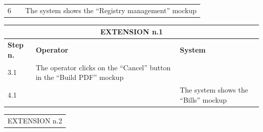 {{{\begin{table}[h]
\begin{tabular}{|p{2cm}|p{6cm}|p{6cm}|}
				\vspace{1mm} \vspace{1mm} \\
			\hline
				\vspace{1mm} 6\vspace{1mm} &
				\vspace{1mm} \vspace{1mm} & 
				\vspace{1mm} The system shows the “Registry management” mockup\vspace{1mm} \\
			\hline
			\end{tabular}
			\end{table}
			
			\begin{table}[h]
			\begin{tabular}{|p{2cm}|p{6cm}|p{6cm}|}
			\hline
				\multicolumn{3}{|c|}{EXTENSION n.1}\\
			\hline
				\centering \vspace{1mm} \bfseries{Step n.} \vspace{1mm} & \vspace{1mm} \bfseries{Operator} \vspace{1mm} & \vspace{1mm} \bfseries{System} \vspace{1mm}\\
			\hline
				\vspace{1mm} 3.1\vspace{1mm} &
				\vspace{1mm} The operator clicks on the “Cancel” button in the “Build PDF” mockup \vspace{1mm} & 
				\vspace{1mm} \vspace{1mm} \\
			\hline
				\vspace{1mm} 4.1\vspace{1mm} &
				\vspace{1mm} \vspace{1mm} & 
				\vspace{1mm} The system shows the “Bills” mockup\vspace{1mm} \\
			\hline
			\end{tabular}
			\end{table}
			\begin{table}[h]
			\begin{tabular}{|p{2cm}|p{6cm}|p{6cm}|}
			\hline
				\multicolumn{3}{|c|}{EXTENSION n.2}\\

\end{tabular}
\end{table}}}}
